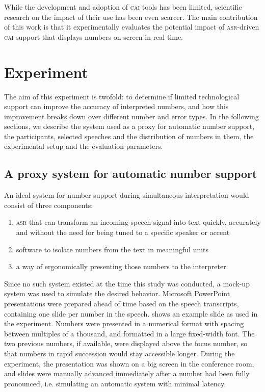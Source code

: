 \documentclass[output=paper]{langsci/langscibook}
\begin{document}
While the development and adoption of \textsc{cai} tools has been limited, scientific research on the impact of their use has been even scarcer. The main contribution of this work is that it experimentally evaluates the potential impact of \textsc{asr}-driven \textsc{cai} support that displays numbers on-screen in real time.

\section{Experiment}

The aim of this experiment is twofold: to determine if limited technological support can improve the accuracy of interpreted numbers, and how this improvement breaks down over different number and error types. In the following sections, we describe the system used as a proxy for automatic number support, the participants, selected speeches and the distribution of numbers in them, the experimental setup and the evaluation parameters.

\subsection{A proxy system for automatic number support}
An ideal system for number support during simultaneous interpretation would consist of three components:

\begin{enumerate}
\item \textsc{asr} that can transform an incoming speech signal into text quickly, accurately and without the need for being tuned to a specific speaker or accent 
\item software to isolate numbers from the text in meaningful units 
\item a way of ergonomically presenting those numbers to the interpreter
\end{enumerate}

Since no such system existed at the time this study was conducted, a mock-up system was used to simulate the desired behavior. Microsoft PowerPoint presentations were prepared ahead of time based on the speech transcripts, containing one slide per number in the speech.  shows an example slide as used in the experiment. Numbers were presented in a numerical format with spacing between multiples of a thousand, and formatted in a large fixed-width font. The two previous numbers, if available, were displayed above the focus number, so that numbers in rapid succession would stay accessible longer. During the experiment, the presentation was shown on a big screen in the conference room, and slides were manually advanced immediately after a number had been fully pronounced, i.e. simulating an automatic system with minimal latency.
\end{document}
